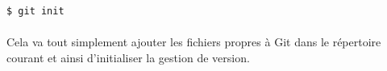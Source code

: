 \documentclass[french, a4paper, 12pt, titlepage]{article}
\begin{document}
\begin{lstlisting}
$ git init
\end{lstlisting}

\paragraph{} Cela va tout simplement ajouter les fichiers propres à Git dans le
répertoire courant et ainsi d'initialiser la gestion de version.

%
\end{document}
